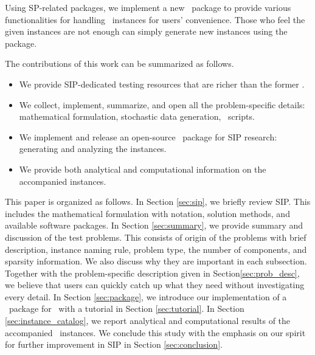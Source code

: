 Using SP-related packages, we implement a new \julia\ package to provide various functionalities for handling \siplibtwo\ instances for users' convenience. Those who feel the given instances are not enough can simply generate new instances using the package.


The contributions of this work can be summarized as follows.
\begin{itemize}
	\item We provide SIP-dedicated testing resources that are richer than the former \siplib.
	\item We collect, implement, summarize, and open all the problem-specific details: mathematical formulation, stochastic data generation, \julia\ scripts.
	\item We implement and release an open-source \julia\ package for SIP research: generating and analyzing the instances.
	\item We provide both analytical and computational information on the accompanied instances.
\end{itemize}


This paper is organized as follows. In Section \ref{sec:sip}, we briefly review SIP. This includes the mathematical formulation with notation, solution methods, and available software packages. In Section \ref{sec:summary}, we provide summary and discussion of the test problems. This consists of origin of the problems with brief description, instance naming rule, problem type, the number of components, and sparsity information. We also discuss why they are important in each subsection. Together with the problem-specific description given in Section\ref{sec:prob_desc}, we believe that users can quickly catch up what they need without investigating every detail. In Section \ref{sec:package}, we introduce our implementation of a \julia\ package for \siplibtwo\ with a tutorial in Section \ref{sec:tutorial}. In Section \ref{sec:instance_catalog}, we report analytical and computational results of the accompanied \smps\ instances. We conclude this study with the emphasis on our spirit for further improvement in SIP in Section \ref{sec:conclusion}. 







